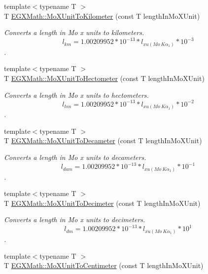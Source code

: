 \begin{DoxyCompactItemize}
{\footnotesize template$<$typename T $>$ }\\T \mbox{\hyperlink{group___e_g_x_math-_conversions-_length_conversions-_non-_s_i-_mo_x_unit-_s_i_ga1653c86da24ce9e73f72f67eb9595c2e}{E\+G\+X\+Math\+::\+Mo\+X\+Unit\+To\+Kilometer}} (const T length\+In\+Mo\+X\+Unit)
\begin{DoxyCompactList}\small\item\em Converts a length in Mo x units to kilometers. \[ l_{km}=1.00209952*10^{-13} * l_{xu(Mo\ K\alpha_1)} * 10^{-3} \]. \end{DoxyCompactList}\item 
{\footnotesize template$<$typename T $>$ }\\T \mbox{\hyperlink{group___e_g_x_math-_conversions-_length_conversions-_non-_s_i-_mo_x_unit-_s_i_ga2114fcf66c72ded7cdfdb5fe0d574e92}{E\+G\+X\+Math\+::\+Mo\+X\+Unit\+To\+Hectometer}} (const T length\+In\+Mo\+X\+Unit)
\begin{DoxyCompactList}\small\item\em Converts a length in Mo x units to hectometers. \[ l_{hm}=1.00209952*10^{-13} * l_{xu(Mo\ K\alpha_1)} * 10^{-2} \]. \end{DoxyCompactList}\item 
{\footnotesize template$<$typename T $>$ }\\T \mbox{\hyperlink{group___e_g_x_math-_conversions-_length_conversions-_non-_s_i-_mo_x_unit-_s_i_ga8062fcff8f184d57df1ba88c72902f0d}{E\+G\+X\+Math\+::\+Mo\+X\+Unit\+To\+Decameter}} (const T length\+In\+Mo\+X\+Unit)
\begin{DoxyCompactList}\small\item\em Converts a length in Mo x units to decameters. \[ l_{dam}=1.00209952*10^{-13} * l_{xu(Mo\ K\alpha_1)} * 10^{-1} \]. \end{DoxyCompactList}\item 
{\footnotesize template$<$typename T $>$ }\\T \mbox{\hyperlink{group___e_g_x_math-_conversions-_length_conversions-_non-_s_i-_mo_x_unit-_s_i_ga986fd20a8a60d8eff54b0eca362518e4}{E\+G\+X\+Math\+::\+Mo\+X\+Unit\+To\+Decimeter}} (const T length\+In\+Mo\+X\+Unit)
\begin{DoxyCompactList}\small\item\em Converts a length in Mo x units to decimeters. \[ l_{dm}=1.00209952*10^{-13} * l_{xu(Mo\ K\alpha_1)} * 10^{1} \]. \end{DoxyCompactList}\item 
{\footnotesize template$<$typename T $>$ }\\T \mbox{\hyperlink{group___e_g_x_math-_conversions-_length_conversions-_non-_s_i-_mo_x_unit-_s_i_ga50ad909022e97526fb43b5887e58f1d7}{E\+G\+X\+Math\+::\+Mo\+X\+Unit\+To\+Centimeter}} (const T length\+In\+Mo\+X\+Unit)

\end{DoxyCompactItemize}
